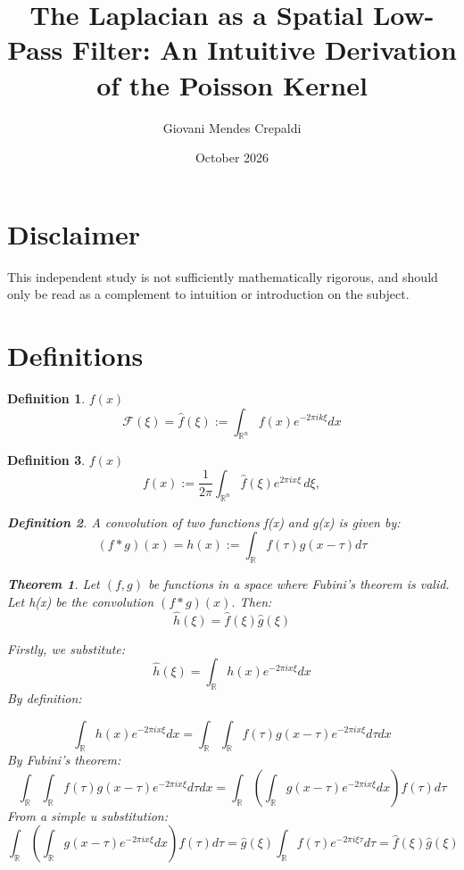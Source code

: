 \documentclass[12pt]{article}
\title{The Laplacian as a Spatial Low-Pass Filter: An Intuitive Derivation of the Poisson Kernel}
\author{Giovani Mendes Crepaldi}
\date{October 2026}
\newtheorem{theorem}{Theorem}
\newtheorem{definition}{Definition}
\begin{document}
\maketitle
\section{Disclaimer}
This independent study is not sufficiently mathematically rigorous, and should only be read as a complement to intuition or introduction on the subject.

\section{Definitions}
\begin{definition}
    \(f(x)\)
\[
\mathscr{F}(\xi)=\hat{f}(\xi):=\int_{\mathbb{R}^{n}}f(x)e^{-2\pi ik\xi}dx
\]
\end{definition}
\begin{definition}
    \(f(x)\)
\[
f(x) :=\frac{1}{2\pi} \int_{\mathbb{R}^{n}} \hat{f}(\xi) e^{2\pi i x \xi} \, d\xi,
\]
\begin{definition}
    A convolution of two functions f(x) and g(x) is given by:
\[
(f*g)(x)=h(x):=\int_{\mathbb{R}}f(\tau)g(x-\tau)d\tau
\]
\end{definition}
\begin{theorem}
    Let \((f,g)\) be functions in a space where Fubini's theorem is valid.
    Let h(x) be the convolution \((f*g)(x)\). 
    Then:    
\[
    \hat{h}(\xi)=\hat{f}(\xi) \hat{g}(\xi)
\]  
\end{theorem}

Firstly, we substitute:
\[
    \hat{h}(\xi)=\int_{\mathbb{R}}h(x)e^{-2\pi ix\xi}dx
\]
By definition:
    
\[
\int_{\mathbb{R}}h(x)e^{-2\pi ix\xi}dx=\int_{\mathbb{R}}\int_{\mathbb{R}}f(\tau)g(x-\tau)e^{-2\pi ix\xi}d\tau dx
\]
By Fubini's theorem:
\[
\int_{\mathbb{R}}\int_{\mathbb{R}} f(\tau)g(x-\tau)e^{-2\pi ix\xi}d\tau dx=\int_{\mathbb{R}}(\int_{\mathbb{R}}g(x-\tau)e^{-2\pi ix\xi}dx)f(\tau)d\tau
\]
From a simple u substitution:
\[
\int_{\mathbb{R}}(\int_{\mathbb{R}}g(x-\tau)e^{-2\pi ix\xi}dx)f(\tau)d\tau=\hat{g}(\xi)\int_{\mathbb{R}}f(\tau)e^{-2\pi i\xi \tau}d\tau=\hat{f}(\xi)\hat{g}(\xi)
\]    
\end{definition}
\end{document}
